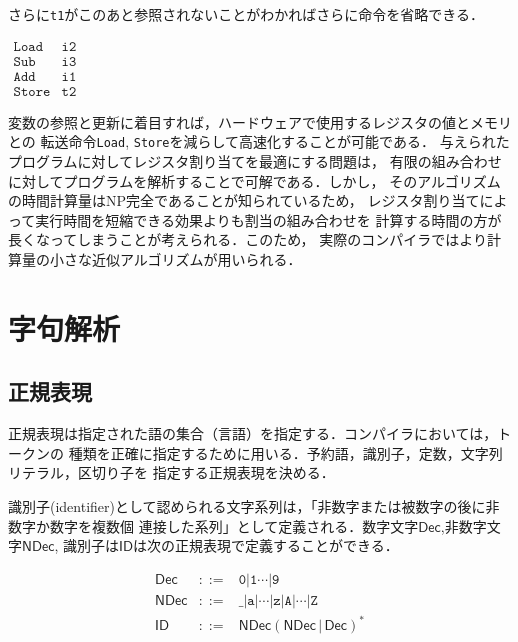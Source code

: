 \documentclass[dvipdfmx,a4j]{jbook}
\begin{document}
さらに\verb|t1|がこのあと参照されないことがわかればさらに命令を省略できる．

\begin{center}
    $\begin{array}{ll}
      \texttt{Load}  & \texttt{i2}\\
      \texttt{Sub}   & \texttt{i3}\\
      \texttt{Add} & \texttt{i1}\\
      \texttt{Store} & \texttt{t2}
    \end{array}$
\end{center}

変数の参照と更新に着目すれば，ハードウェアで使用するレジスタの値とメモリとの
転送命令\verb|Load|, \verb|Store|を減らして高速化することが可能である．
与えられたプログラムに対してレジスタ割り当てを最適にする問題は，
有限の組み合わせに対してプログラムを解析することで可解である．しかし，
そのアルゴリズムの時間計算量はNP完全であることが知られているため，
レジスタ割り当てによって実行時間を短縮できる効果よりも割当の組み合わせを
計算する時間の方が長くなってしまうことが考えられる．このため，
実際のコンパイラではより計算量の小さな近似アルゴリズムが用いられる．

\chapter{字句解析}

\section{正規表現}

正規表現は指定された語の集合（言語）を指定する．コンパイラにおいては，トークンの
種類を正確に指定するために用いる．予約語，識別子，定数，文字列リテラル，区切り子を
指定する正規表現を決める．

識別子(identifier)として認められる文字系列は，「非数字または被数字の後に非数字か数字を複数個
連接した系列」として定義される．数字文字$\mathsf{Dec}$,非数字文字$\mathsf{NDec}$,
識別子は$\mathsf{ID}$は次の正規表現で定義することができる．

\[\begin{array}{rcl}
  \mathsf{Dec} & \mathtt{::=} & \texttt{0}|\texttt{1}\cdots|\texttt{9}\\
  \mathsf{NDec} & \mathtt{::=} & \texttt{\_}|\texttt{a}|\cdots|\texttt{z}|\texttt{A}|\cdots|\texttt{Z}\\
  \mathsf{ID} & \mathtt{::=} & \mathsf{NDec}(\mathsf{NDec}\,|\,\mathsf{Dec})^\ast
\end{array}\]
\end{document}
